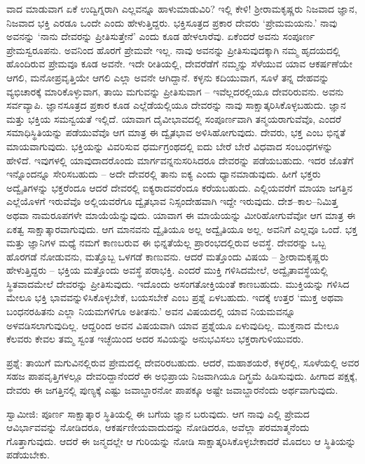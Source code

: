 ವಾದ ಮಾಡುವಾಗ ಏಕೆ ಉದ್ವಿಗ್ನರಾಗಿ ಎಲ್ಲವನ್ನೂ ಹಾಳುಮಾಡುವಿರಿ? ಇಲ್ಲಿ ಕೇಳಿ! ಶ‍್ರೀರಾಮಕೃಷ್ಣರು ನಿಜವಾದ ಜ್ಞಾನ, ನಿಜವಾದ ಭಕ್ತಿ ಎರಡೂ ಒಂದೇ ಎಂದು ಹೇಳುತ್ತಿದ್ದರು. ಭಕ್ತಿಸೂತ್ರದ ಪ್ರಕಾರ ದೇವರು ‘ಪ್ರೇಮಮಯನು.’ ನಾವು ಅವನನ್ನು ‘ನಾನು ದೇವರನ್ನು ಪ್ರೀತಿಸುತ್ತೇನೆ’ ಎಂದು ಕೂಡ ಹೇಳಲಾರೆವು. ಏಕೆಂದರೆ ಅವನು ಸಂಪೂರ್ಣ ಪ್ರೇಮಸ್ವರೂಪನು. ಅವನಿಂದ ಹೊರಗೆ ಪ್ರೇಮವೇ ಇಲ್ಲ. ನಾವು ಅವನನ್ನು ಪ್ರೀತಿಸುವುದಕ್ಕಾಗಿ ನಮ್ಮ ಹೃದಯದಲ್ಲಿ ಹೊಂದಿರುವ ಪ್ರೇಮವೂ ಕೂಡ ಅವನೇ. ಇದೇ ರೀತಿಯಲ್ಲಿ, ದೇವರೆಡೆಗೆ ನಮ್ಮನ್ನು ಸೆಳೆಯುವ ಯಾವ ಆಕರ್ಷಣೆಯೇ ಆಗಲಿ, ಮನೋಪ್ರವೃತ್ತಿಯೇ ಆಗಲಿ ಎಲ್ಲಾ ಅವನೇ ಆಗಿದ್ದಾನೆ. ಕಳ್ಳನು ಕದಿಯುವಾಗ, ಸೂಳೆ ತನ್ನ ದೇಹವನ್ನು ವ್ಯಭಿಚಾರಕ್ಕೆ ಮಾರಿಕೊಳ್ಳುವಾಗ, ತಾಯಿ ಮಗುವನ್ನು ಪ್ರೀತಿಸುವಾಗ – ಇವೆಲ್ಲದರಲ್ಲಿಯೂ ದೇವರಿರುವನು. ಅವನು ಸರ್ವವ್ಯಾಪಿ. ಜ್ಞಾನಸೂತ್ರದ ಪ್ರಕಾರ ಕೂಡ ಎಲ್ಲೆಡೆಯಲ್ಲಿಯೂ ದೇವರನ್ನು ನಾವು ಸಾಕ್ಷಾತ್ಕರಿಸಿಕೊಳ್ಳಬಹುದು. ಜ್ಞಾನ ಮತ್ತು ಭಕ್ತಿಯ ಸಮನ್ವಯತೆ ಇಲ್ಲಿದೆ. ಯಾವಾಗ ದೈವೀಭಾವದಲ್ಲಿ ಸಂಪೂರ್ಣವಾಗಿ ತನ್ಮಯರಾಗುವೆವೊ, ಎಂದರೆ ಸಮಾಧಿಸ್ಥಿತಿಯನ್ನು ಪಡೆಯುವೆವೊ ಆಗ ಮಾತ್ರ ಈ ದ್ವೈತಭಾವ ಅಳಿಸಿಹೋಗುವುದು. ದೇವರು, ಭಕ್ತ ಎಂಬ ಭಿನ್ನತೆ ಮಾಯವಾಗುವುದು. ಭಕ್ತಿಯನ್ನು ವಿವರಿಸುವ ಧರ್ಮಗ್ರಂಥದಲ್ಲಿ ಐದು ಬೇರೆ ಬೇರೆ ವಿಧವಾದ ಸಂಬಂಧಗಳನ್ನು ಹೇಳಿದೆ. ಇವುಗಳಲ್ಲಿ ಯಾವುದಾದರೊಂದು ಮಾರ್ಗವನ್ನನುಸರಿಸಿದರೂ ದೇವರನ್ನು ಪಡೆಯಬಹುದು. ಇದರ ಜೊತೆಗೆ ಇನ್ನೊಂದನ್ನೂ ಸೇರಿಸಬಹುದು – ಅದೇ ದೇವರಲ್ಲಿ ತಾನು ಐಕ್ಯ ಎಂದು ಧ್ಯಾನಮಾಡುವುದು. ಹೀಗೆ ಭಕ್ತರು ಅದ್ವೈತಿಗಳನ್ನು ಭಕ್ತರೆಂದೂ ಆದರೆ ದೇವರಲ್ಲಿ ಐಕ್ಯರಾದವರೆಂದೂ ಕರೆಯಬಹುದು. ಎಲ್ಲಿಯವರೆಗೆ ಮಾಯಾ ಜಗತ್ತಿನ ಎಲ್ಲೆಯೊಳಗೆ ಇರುವೆವೊ ಅಲ್ಲಿಯವರೆಗೂ ದ್ವೈತಭಾವ ನಿಸ್ಸಂದೇಹವಾಗಿ ಇದ್ದೇ ಇರುವುದು. ದೇಶ–ಕಾಲ–ನಿಮಿತ್ತ ಅಥವಾ ನಾಮರೂಪಗಳೇ ಮಾಯೆಯೆನ್ನುವುದು. ಯಾವಾಗ ಈ ಮಾಯೆಯನ್ನು ಮೀರಿಹೋಗುವೆವೋ ಆಗ ಮಾತ್ರ ಈ ಏಕತ್ವ ಸಾಕ್ಷಾತ್ಕಾರವಾಗುವುದು. ಆಗ ಮಾನವನು ದ್ವೈತಿಯೂ ಅಲ್ಲ ಅದ್ವೈತಿಯೂ ಅಲ್ಲ. ಅವನಿಗೆ ಎಲ್ಲವೂ ಒಂದೆ. ಭಕ್ತ ಮತ್ತು ಜ್ಞಾನಿಗಳ ಮಧ್ಯೆ ನಮಗೆ ಕಾಣಬರುವ ಈ ಭಿನ್ನತೆಯೆಲ್ಲ ಪ್ರಾರಂಭದಲ್ಲಿರುವ ಅವಸ್ಥೆ. ದೇವರನ್ನು ಒಬ್ಬ ಹೊರಗಡೆ ನೋಡುವನು, ಮತ್ತೊಬ್ಬ ಒಳಗಡೆ ಕಾಣುವನು. ಆದರೆ ಮತ್ತೊಂದು ವಿಷಯ – ಶ‍್ರೀರಾಮಕೃಷ್ಣರು ಹೇಳುತ್ತಿದ್ದರು – ಭಕ್ತಿಯ ಮತ್ತೊಂದು ಅವಸ್ಥೆ ಪರಾಭಕ್ತಿ. ಎಂದರೆ ಮುಕ್ತಿ ಗಳಿಸಿದಮೇಲೆ, ಅದ್ವೈತಾವಸ್ಥೆಯಲ್ಲಿ ಸ್ಥಿತವಾದಮೇಲೆ ದೇವರನ್ನು ಪ್ರೀತಿಸುವುದು. ಇದೊಂದು ಅಸಂಗತೋಕ್ತಿಯಂತೆ ಕಾಣಬಹುದು. ಮುಕ್ತಿಯನ್ನು ಗಳಿಸಿದ ಮೇಲೂ ಭಕ್ತಿ ಭಾವವನ್ನುಳಿಸಿಕೊಳ್ಳಬೇಕೆ, ಬಯಸಬೇಕೆ ಎಂಬ ಪ್ರಶ್ನೆ ಏಳಬಹುದು. ಇದಕ್ಕೆ ಉತ್ತರ ‘ಮುಕ್ತ ಅಥವಾ ಬಂಧನರಹಿತನು ಎಲ್ಲಾ ನಿಯಮಗಳಿಗೂ ಅತೀತನು.’ ಅವನ ವಿಷಯದಲ್ಲಿ ಯಾವ ನಿಯಮವನ್ನೂ ಅಳವಡಿಸಲಾಗುವುದಿಲ್ಲ. ಆದ್ದರಿಂದ ಅವನ ವಿಷಯವಾಗಿ ಯಾವ ಪ್ರಶ್ನೆಯೂ ಏಳುವುದಿಲ್ಲ. ಮುಕ್ತನಾದ ಮೇಲೂ ಕೆಲವರು ಕೇವಲ ತಮ್ಮ ಸ್ವಂತ ಇಚ್ಛೆಯಿಂದ ಅದರ ಸವಿಯನ್ನು ಅನುಭವಿಸಲು ಭಕ್ತರಾಗುಳಿಯುವರು.

ಪ್ರಶ್ನೆ: ತಾಯಿಗೆ ಮಗುವಿನಲ್ಲಿರುವ ಪ್ರೇಮದಲ್ಲಿ ದೇವರಿರಬಹುದು. ಆದರೆ, ಮಹಾಶಯರೆ, ಕಳ್ಳರಲ್ಲಿ, ಸೂಳೆಯಲ್ಲಿ ಅವರ ಸಹಜ ಪಾಪವೃತ್ತಿಗಳಲ್ಲೂ ದೇವರಿದ್ದಾನೆಂದರೆ ಈ ಅಭಿಪ್ರಾಯ ನಿಜವಾಗಿಯೂ ದಿಗ್ಭ್ರಮೆ ಹಿಡಿಸುವುದು. ಹೀಗಾದ ಪಕ್ಷಕ್ಕೆ, ದೇವರು ಈ ಜಗತ್ತಿನಲ್ಲಿ ಪುಣ್ಯಕ್ಕೆ ಎಷ್ಟು ಜವಾಬ್ದಾರನೋ ಪಾಪಕ್ಕೂ ಅಷ್ಟೇ ಜವಾಬ್ದಾರನೆಂದು ಅರ್ಥವಾಗುವುದು.

ಸ್ವಾಮೀಜಿ: ಪೂರ್ಣ ಸಾಕ್ಷಾತ್ಕಾರ ಸ್ಥಿತಿಯಲ್ಲಿ ಈ ಬಗೆಯ ಜ್ಞಾನ ಬರುವುದು. ಆಗ ನಾವು ಎಲ್ಲಿ ಪ್ರೇಮದ ಆವಿರ್ಭಾವವನ್ನು ನೋಡಿದರೂ, ಆಕರ್ಷಣೀಯವಾದುದನ್ನು ನೋಡಿದರೂ, ಅವೆಲ್ಲಾ ಪರಮಾತ್ಮನೆಂದು ಗೊತ್ತಾಗುವುದು. ಆದರೆ ಈ ಜನ್ಮದಲ್ಲೇ ಆ ಗುರಿಯನ್ನು ನೋಡಿ ಸಾಕ್ಷಾತ್ಕರಿಸಿಕೊಳ್ಳಬೇಕಾದರೆ ಮೊದಲು ಆ ಸ್ಥಿತಿಯನ್ನು ಪಡೆಯಬೇಕು.

